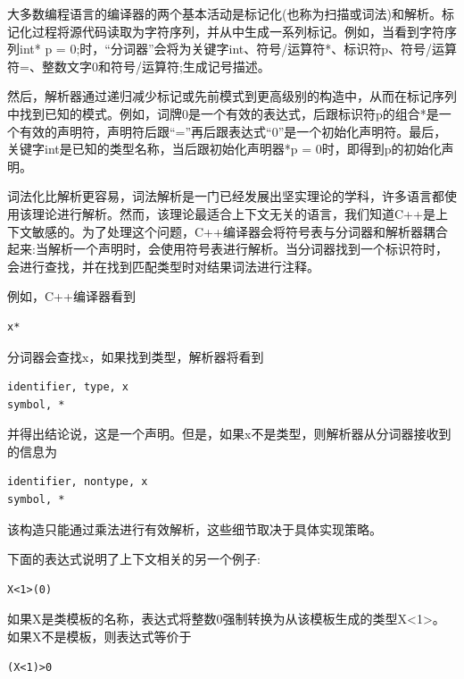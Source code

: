 
大多数编程语言的编译器的两个基本活动是标记化(也称为扫描或词法)和解析。标记化过程将源代码读取为字符序列，并从中生成一系列标记。例如，当看到字符序列int* p = 0;时，“分词器”会将为关键字int、符号/运算符*、标识符p、符号/运算符=、整数文字0和符号/运算符;生成记号描述。

然后，解析器通过递归减少标记或先前模式到更高级别的构造中，从而在标记序列中找到已知的模式。例如，词牌0是一个有效的表达式，后跟标识符p的组合*是一个有效的声明符，声明符后跟“=”再后跟表达式“0”是一个初始化声明符。最后，关键字int是已知的类型名称，当后跟初始化声明器*p = 0时，即得到p的初始化声明。


词法化比解析更容易，词法解析是一门已经发展出坚实理论的学科，许多语言都使用该理论进行解析。然而，该理论最适合上下文无关的语言，我们知道C++是上下文敏感的。为了处理这个问题，C++编译器会将符号表与分词器和解析器耦合起来:当解析一个声明时，会使用符号表进行解析。当分词器找到一个标识符时，会进行查找，并在找到匹配类型时对结果词法进行注释。

例如，C++编译器看到

\begin{lstlisting}[style=styleCXX]
x*
\end{lstlisting}

分词器会查找x，如果找到类型，解析器将看到

\begin{lstlisting}[style=styleCXX]
identifier, type, x
symbol, *
\end{lstlisting}

并得出结论说，这是一个声明。但是，如果x不是类型，则解析器从分词器接收到的信息为

\begin{lstlisting}[style=styleCXX]
identifier, nontype, x
symbol, *
\end{lstlisting}

该构造只能通过乘法进行有效解析，这些细节取决于具体实现策略。

下面的表达式说明了上下文相关的另一个例子:

\begin{lstlisting}[style=styleCXX]
X<1>(0)
\end{lstlisting}

如果X是类模板的名称，表达式将整数0强制转换为从该模板生成的类型X<1>。如果X不是模板，则表达式等价于

\begin{lstlisting}[style=styleCXX]
(X<1)>0
\end{lstlisting}

